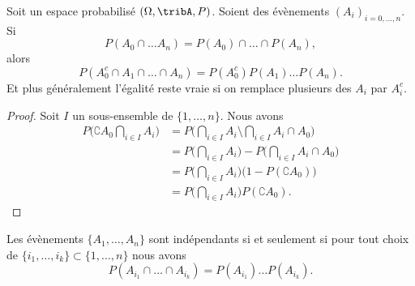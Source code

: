 \begin{lemma}       \label{LemIndepEvenCompl}
	Soit un espace probabilisé \( (\Omega,\tribA,P)\). Soient des évènements \( (A_i)_{i=0,\ldots,n}\). Si
	\begin{equation}
		P(A_0\cap\ldots A_n)=P(A_0)\cap\ldots\cap P(A_n),
	\end{equation}
	alors
	\begin{equation}
		P(A_0^c\cap A_1\cap\dots\cap A_n)=P(A_0^c)P(A_1)\ldots P(A_n).
	\end{equation}
	Et plus généralement l'égalité reste vraie si on remplace plusieurs des \( A_i\) par \( A_i^c\).
\end{lemma}

\begin{proof}
	Soit \( I\) un sous-ensemble de \( \{ 1,\ldots,n \}\). Nous avons
	\begin{subequations}
		\begin{align}
			P\big( \complement A_0\bigcap_{i\in I}A_i \big) & =P\big( \bigcap_{i\in I}A_i\setminus\bigcap_{i\in I}A_i\cap A_0 \big)      \\
			                                                & =P\big( \bigcap_{i\in I}A_i \big)-P\big( \bigcap_{i\in I}A_i\cap A_0 \big) \\
			                                                & =P\big( \bigcap_{i\in I}A_i \big)\big( 1-P(\complement A_0) \big)          \\
			                                                & =P\big( \bigcap_{i\in I}A_i \big)P(\complement A_0).
		\end{align}
	\end{subequations}
\end{proof}

\begin{proposition}	\label{PROPooNLRBooJzDyiF}
	Les évènements \( \{ A_1,\ldots,A_n \}\) sont indépendants si et seulement si pour tout choix de \( \{ i_1,\ldots,i_k \}\subset\{ 1,\ldots,n \}\) nous avons
	\begin{equation}
		P(A_{i_1}\cap\ldots\cap A_{i_k})=P(A_{i_1})\ldots P(A_{i_k}).
	\end{equation}
\end{proposition}

